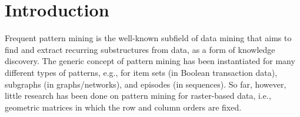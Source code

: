 \documentclass{llncs}
\begin{document}
\section{Introduction}

Frequent pattern mining \cite{aggarwal2014fpm} is the well-known subfield of data mining that aims to find and extract recurring substructures from data, as a form of knowledge discovery. The generic concept of pattern mining has been instantiated for many different types of patterns, e.g., for item sets (in Boolean transaction data), subgraphs (in graphs/networks), and episodes (in sequences). So far, however, little research has been done on pattern mining for raster-based data, i.e., geometric matrices in which the row and column orders are fixed. %
\end{document}
